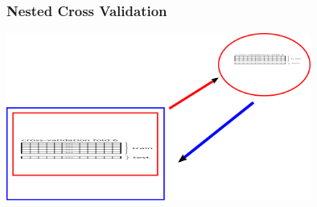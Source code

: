 \documentclass{beamer}
\begin{document}
  \begin{frame}
    \frametitle{Nested Cross Validation}
        \begin{center}
            \includegraphics[height=5.5cm]{../pictures/nested_validation}
        \end{center}     
    \end{frame}  
                         
\end{document}
